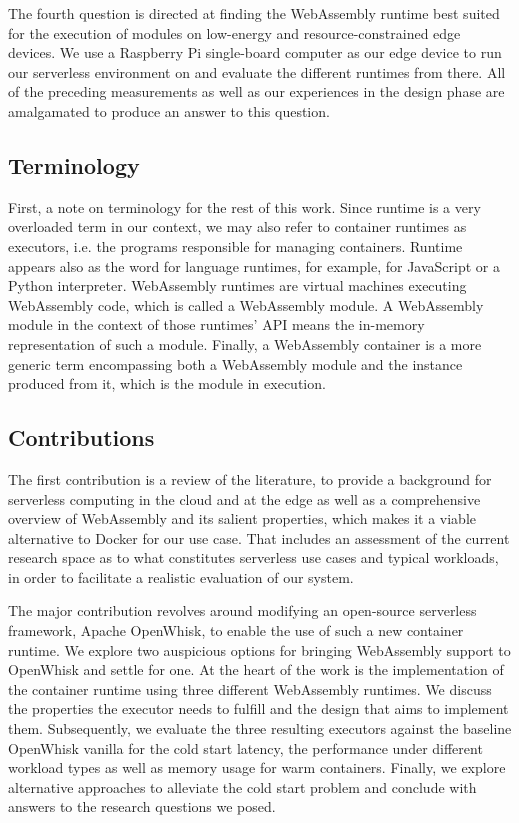 The fourth question is directed at finding the WebAssembly runtime best suited for the execution of modules on low-energy and resource-constrained edge devices. We use a Raspberry Pi single-board computer as our edge device to run our serverless environment on and evaluate the different runtimes from there. All of the preceding measurements as well as our experiences in the design phase are amalgamated to produce an answer to this question.

\subsection{Terminology}

First, a note on terminology for the rest of this work. Since runtime is a very overloaded term in our context, we may also refer to container runtimes as executors, i.e. the programs responsible for managing containers. Runtime appears also as the word for language runtimes, for example,  for JavaScript or a Python interpreter.
WebAssembly runtimes are virtual machines executing WebAssembly code, which is called a WebAssembly module. A WebAssembly module in the context of those runtimes' API means the in-memory representation of such a module. Finally, a WebAssembly container is a more generic term encompassing both a WebAssembly module and the instance produced from it, which is the module in execution.

\subsection{Contributions}

The first contribution is a review of the literature, to provide a background for serverless computing in the cloud and at the edge as well as a comprehensive overview of WebAssembly and its salient properties, which makes it a viable alternative to Docker for our use case. That includes an assessment of the current research space as to what constitutes serverless use cases and typical workloads, in order to facilitate a realistic evaluation of our system.

The major contribution revolves around modifying an open-source serverless framework, Apache OpenWhisk, to enable the use of such a new container runtime. We explore two auspicious options for bringing WebAssembly support to OpenWhisk and settle for one. At the heart of the work is the implementation of the container runtime using three different WebAssembly runtimes. We discuss the properties the executor needs to fulfill and the design that aims to implement them. Subsequently, we evaluate the three resulting executors against the baseline OpenWhisk vanilla for the cold start latency, the performance under different workload types as well as memory usage for warm containers. Finally, we explore alternative approaches to alleviate the cold start problem and conclude with answers to the research questions we posed.

